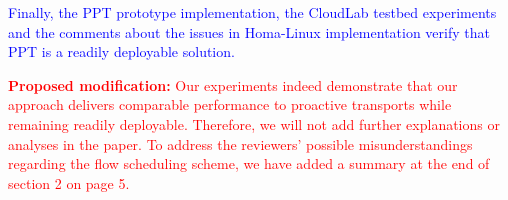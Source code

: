 \documentclass[12pt,one-column]{article}
\begin{document}
\textcolor{blue}{Finally, the PPT prototype implementation, the CloudLab testbed experiments and the comments about the issues in Homa-Linux implementation verify that PPT is a readily deployable solution.
}

\noindent\textcolor{red}{\textbf{Proposed modification: }
Our experiments indeed demonstrate that our approach delivers comparable performance to proactive transports while remaining readily deployable. Therefore, we will not add further explanations or analyses in the paper. 
To address the reviewers' possible misunderstandings regarding the flow scheduling scheme, we have added a summary at the end of section 2 on page 5.
}


\end{document}
